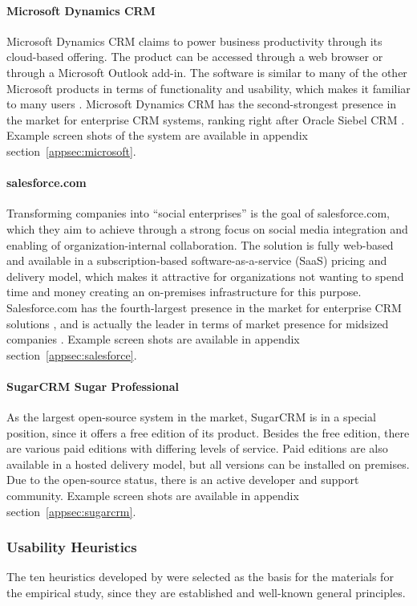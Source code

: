 \paragraph{Microsoft Dynamics CRM}
Microsoft Dynamics CRM claims to power business productivity through its cloud-based offering. The product can be accessed through a web browser or through a Microsoft Outlook add-in. The software is similar to many of the other Microsoft products in terms of functionality and usability, which makes it familiar to many users \citep{Band2010}. Microsoft Dynamics CRM has the second-strongest presence in the market for enterprise CRM systems, ranking right after Oracle Siebel CRM \citep{Band2010}. Example screen shots of the system are available in appendix section~\ref{appsec:microsoft}.

\paragraph{salesforce.com}
Transforming companies into ``social enterprises'' is the goal of salesforce.com, which they aim to achieve through a strong focus on social media integration and enabling of organization-internal collaboration. The solution is fully web-based and available in a subscription-based software-as-a-service (SaaS) pricing and delivery model, which makes it attractive for organizations not wanting to spend time and money creating an on-premises infrastructure for this purpose. Salesforce.com has the fourth-largest presence in the market for enterprise CRM solutions \citep{Band2010}, and is actually the leader in terms of market presence for midsized companies \citep{Band2010a}. Example screen shots are available in appendix section~\ref{appsec:salesforce}.

\paragraph{SugarCRM Sugar Professional}
As the largest open-source system in the market, SugarCRM is in a special position, since it offers a free edition of its product. Besides the free edition, there are various paid editions with differing levels of service. Paid editions are also available in a hosted delivery model, but all versions can be installed on premises. Due to the open-source status, there is an active developer and support community. Example screen shots are available in appendix section~\ref{appsec:sugarcrm}.

\subsubsection{Usability Heuristics}
The ten heuristics developed by \citet[p.\ 30]{Nielsen1994a} were selected as the basis for the materials for the empirical study, since they are established and well-known general principles.


